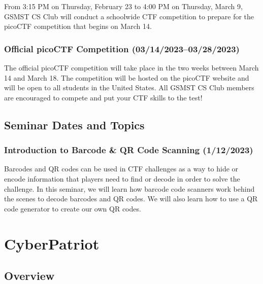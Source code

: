 \documentclass[
  letterpaper,
  DIV=11,
  numbers=noendperiod]{scrartcl}
\begin{document}
From 3:15 PM on Thursday, February 23 to 4:00 PM on Thursday, March 9,
GSMST CS Club will conduct a schoolwide CTF competition to prepare for
the picoCTF competition that begins on March 14.

\hypertarget{official-picoctf-competition-0314202303282023}{%
\subsubsection{Official picoCTF Competition
(03/14/2023--03/28/2023)}\label{official-picoctf-competition-0314202303282023}}

The official picoCTF competition will take place in the two weeks
between March 14 and March 18. The competition will be hosted on the
picoCTF website and will be open to all students in the United States.
All GSMST CS Club members are encouraged to compete and put your CTF
skills to the test!

\hypertarget{seminar-dates-and-topics}{%
\subsection{Seminar Dates and Topics}\label{seminar-dates-and-topics}}

\hypertarget{introduction-to-barcode-qr-code-scanning-1122023}{%
\subsubsection{Introduction to Barcode \& QR Code Scanning
(1/12/2023)}\label{introduction-to-barcode-qr-code-scanning-1122023}}

Barcodes and QR codes can be used in CTF challenges as a way to hide or
encode information that players need to find or decode in order to solve
the challenge. In this seminar, we will learn how barcode code scanners
work behind the scenes to decode barcodes and QR codes. We will also
learn how to use a QR code generator to create our own QR codes.

\newpage{}

\hypertarget{cyberpatriot}{%
\section{CyberPatriot}\label{cyberpatriot}}

\hypertarget{overview-1}{%
\subsection{Overview}\label{overview-1}}
\end{document}
